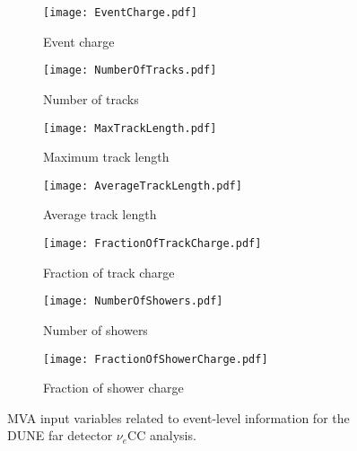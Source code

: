 \begin{figure}
  \centering
  \begin{subfigure}[t]{0.4\linewidth}
    \centering
    \texttt{[image: EventCharge.pdf]}
    \caption{Event charge}
  \end{subfigure}
  \begin{subfigure}[t]{0.4\linewidth}
    \centering
    \texttt{[image: NumberOfTracks.pdf]}
    \caption{Number of tracks}
  \end{subfigure}
  \begin{subfigure}[t]{0.4\linewidth}
    \centering
    \texttt{[image: MaxTrackLength.pdf]}
    \caption{Maximum track length}
  \end{subfigure}
  \begin{subfigure}[t]{0.4\linewidth}
    \centering
    \texttt{[image: AverageTrackLength.pdf]}
    \caption{Average track length}
  \end{subfigure}
  \begin{subfigure}[t]{0.4\linewidth}
    \centering
    \texttt{[image: FractionOfTrackCharge.pdf]}
    \caption{Fraction of track charge}
  \end{subfigure}
  \begin{subfigure}[t]{0.4\linewidth}
    \centering
    \texttt{[image: NumberOfShowers.pdf]}
    \caption{Number of showers}
  \end{subfigure}
  \begin{subfigure}[t]{0.4\linewidth}
    \centering
    \texttt{[image: FractionOfShowerCharge.pdf]}
    \caption{Fraction of shower charge}
  \end{subfigure}
  \caption{MVA input variables related to event-level information for the DUNE far detector $\nu_e$CC analysis.}
  \label{fig:FDMVAEventVariables}
\end{figure}

